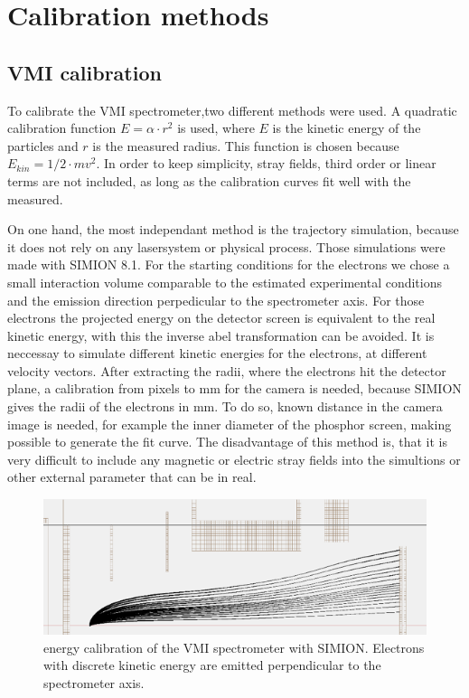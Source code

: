 \section{Calibration methods}
\subsection{VMI calibration}
To calibrate the VMI spectrometer,two different methods were used. A quadratic calibration function  $E=\alpha\cdot r^2$ is used, where $E$ is the kinetic energy of the particles and $r$ is the measured radius. This function is chosen because $E_{kin}=1/2 \cdot m v^2$. In order to keep simplicity,  stray fields, third order or linear terms are not included, as long as the calibration curves fit well with the measured.

On one hand, the most independant method is the trajectory simulation, because it does not rely on any lasersystem or physical process. Those simulations were made with SIMION 8.1. For the starting conditions for the electrons we chose a small interaction volume comparable to the estimated experimental conditions and the emission direction perpedicular to the spectrometer axis. For those electrons the projected energy on the detector screen is equivalent to the real kinetic energy, with this the inverse abel transformation can be avoided. It is neccessay to simulate different kinetic energies for the electrons, at different velocity vectors. After extracting the radii, where the electrons hit the detector plane, a calibration from pixels to mm for the camera is needed, because SIMION gives the radii of the electrons in mm. To do so, known distance in the camera image is needed, for example the inner diameter of the phosphor screen, making possible to generate the fit curve. The disadvantage of this method is, that it is very difficult to include any magnetic or electric stray fields into the simultions or other external parameter that can be in real.

\begin{figure}[h!]
\centering
\includegraphics[scale=1]{../images/simion_calib.png}
\caption{energy calibration of the VMI spectrometer with SIMION. Electrons with discrete kinetic energy are emitted perpendicular to the spectrometer axis.}
\end{figure}


